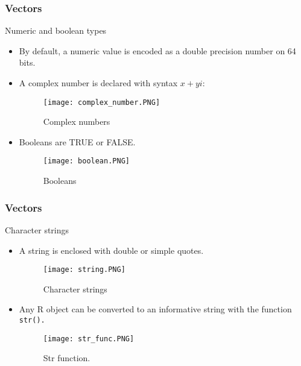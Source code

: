 \documentclass[main.tex]{subfiles}
\begin{document}
\begin{frame}
    \frametitle{Vectors}
    \begin{block}{Numeric and boolean types}
        \begin{itemize}
            \item<+-> By default, a numeric value is encoded 
            as a double precision number on 64 bits. 
            \item<+-> A complex number is declared with syntax $x + yi$:
           \begin{figure}[htbp]
            \centering
            \texttt{[image: complex\_number.PNG]}
            \caption{Complex numbers}
            \label{fig:complex_numbers}
           \end{figure}
           \item<+-> Booleans are TRUE or FALSE.
           \begin{figure}[htbp]
            \centering
            \texttt{[image: boolean.PNG]}
            \caption{Booleans}
            \label{fig:booleans}
           \end{figure}
        \end{itemize}
    \end{block}
\end{frame}
\begin{frame}
    \frametitle{Vectors}
    \begin{block}{Character strings}
        \begin{itemize}
           \item<+-> A string is enclosed with double or simple quotes.
           \begin{figure}[htbp]
            \centering
           \texttt{[image: string.PNG]} 
            \caption{Character strings}
            \label{fig:char_strings}
           \end{figure}
           \item<+-> Any R object can be converted to an informative string with the function
           \texttt{str().}
        \begin{figure}[htbp]
            \centering
           \texttt{[image: str\_func.PNG]} 
            \caption{Str function.}
            \label{fig:str_func}
           \end{figure}
        \end{itemize}
    \end{block}
\end{frame}
\end{document}
